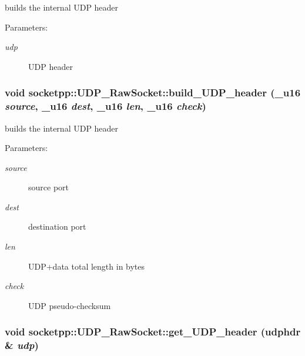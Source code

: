 builds the internal UDP header 

\begin{Desc}
\item[Parameters:]
\begin{description}
\item[{\em udp}]UDP header \end{description}
\end{Desc}
\hypertarget{classsocketpp_1_1UDP__RawSocket_f107901141295d21929008e281aac00f}{
\subsubsection[{build\_\-UDP\_\-header}]{\setlength{\rightskip}{0pt plus 5cm}void socketpp::UDP\_\-RawSocket::build\_\-UDP\_\-header (\_\-u16 {\em source}, \/  \_\-u16 {\em dest}, \/  \_\-u16 {\em len}, \/  \_\-u16 {\em check})}}
\label{classsocketpp_1_1UDP__RawSocket_f107901141295d21929008e281aac00f}


builds the internal UDP header 

\begin{Desc}
\item[Parameters:]
\begin{description}
\item[{\em source}]source port \item[{\em dest}]destination port \item[{\em len}]UDP+data total length in bytes \item[{\em check}]UDP pseudo-checksum \end{description}
\end{Desc}
\hypertarget{classsocketpp_1_1UDP__RawSocket_597a30fc537dce06c85663add29defdc}{
\subsubsection[{get\_\-UDP\_\-header}]{\setlength{\rightskip}{0pt plus 5cm}void socketpp::UDP\_\-RawSocket::get\_\-UDP\_\-header (udphdr \& {\em udp})}}
\label{classsocketpp_1_1UDP__RawSocket_597a30fc537dce06c85663add29defdc}


